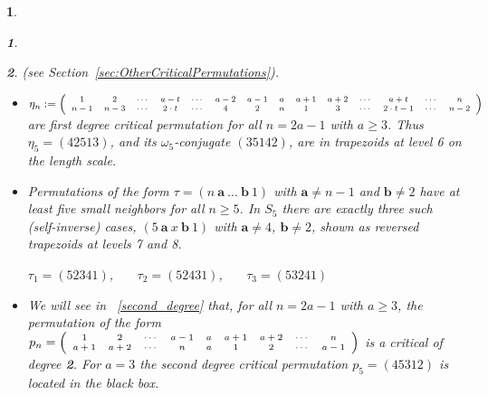 \documentclass[a4 paper,12pt]{article}
\newtheorem{numeris}{}[section]
\newtheorem{subnum}{}[numeris]
\begin{document}
\begin{numeris}
\begin{subnum}
\end{subnum}
\begin{subnum} (see Section~\ref{sec:OtherCriticalPermutations}). 
\begin{itemize}
	\item[$\bullet$]  $ \eta_n := \begin{scriptsize}\left(
\begin{array}{ccccccccccccccc}
	1 &2& \cdots & a-t & \cdots &a -2 &  a -1  & a & a+1 & a+2 & \cdots & a+ t & \cdots & n \\
	n-1 & n-3 & \cdots & 2\cdot t & \cdots &4 &  2 & n & 1 & 3 & \cdots & 2\cdot t-1 & \cdots & n-2
\end{array}
\right)\end{scriptsize}$ are first degree critical permutation  for all  $n=2a-1$ with $a\geq 3$. Thus $\eta_5=(42513)$, and its $\omega_5$-conjugate $(35142)$,  are   in trapezoids  at level 6 on the length  scale.  
	\item[$\bullet$] 	
	Permutations of the form $\tau = (n\ \textbf{a}\ \ldots\ \textbf{b}\ 1)$ with $\textbf{a}\neq n-1$ and $\textbf{b}\neq 2$ have at least five small neighbors for all $n\geq 5$. In $S_5$ there are exactly three such (self-inverse) cases, $(5\ \textbf{a}\ x\ \textbf{b}\ 1)$ with $\textbf{a}\neq 4$, $\textbf{b}\neq 2$, shown as \textit{reversed} trapezoids at levels 7 and 8.
	
\begin{center}
$\tau_{1}=(52341)$, \  \  \   $\tau_{2}=(52431)$, \  \  \   $\tau_{3}=(53241)$
\end{center}
\item[$\bullet$]   We will see in ~\ref{second_degree}  that,  for all $n= 2a-1$ with $a\geq 3$, the permutation of the form
$p_n =\begin{scriptsize}  \left(
\begin{array}{ccccccccc}
	1 & 2 & \cdots & a-1 & a & a+1& a+2 & \cdots & n\\
	a+1 & a+2 & \cdots & n & a & 1& 2 & \cdots & a-1
\end{array}
\right) \end{scriptsize}$
 is a critical of degree \textbf{\textit{2}}. For $a=3$ the second degree critical  permutation  $p_5= (45312)$ is located in the black box.
\end{itemize}
\label{crit_in_S_5_not_from_S_4}  
\end{subnum}









\end{numeris}
\end{document}
